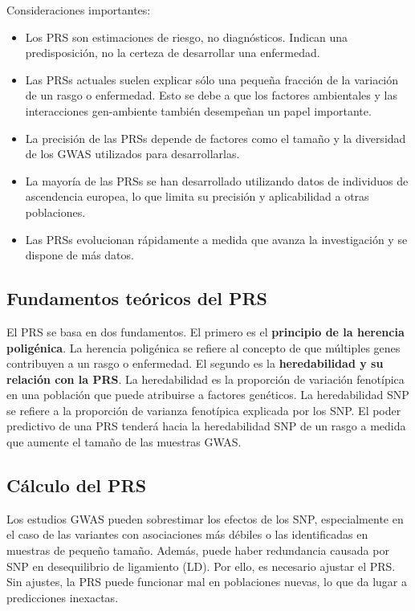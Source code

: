 Consideraciones importantes:
\begin{itemize}
\item Los PRS son estimaciones de riesgo, no diagnósticos. Indican una predisposición, no la certeza de desarrollar una enfermedad.
\item Las PRSs actuales suelen explicar sólo una pequeña fracción de la variación de un rasgo o enfermedad. Esto se debe a que los factores ambientales y las interacciones gen-ambiente también desempeñan un papel importante.
\item La precisión de las PRSs depende de factores como el tamaño y la diversidad de los GWAS utilizados para desarrollarlas.
\item La mayoría de las PRSs se han desarrollado utilizando datos de individuos de ascendencia europea, lo que limita su precisión y aplicabilidad a otras poblaciones.
\item Las PRSs evolucionan rápidamente a medida que avanza la investigación y se dispone de más datos.
\end{itemize}

\subsection{Fundamentos teóricos del PRS}
El PRS se basa en dos fundamentos. El primero es el \textbf{principio de la herencia poligénica}.
La herencia poligénica se refiere al concepto de que múltiples genes contribuyen a un rasgo o enfermedad.
El segundo es la \textbf{heredabilidad y su relación con la PRS}.
La heredabilidad es la proporción de variación fenotípica en una población que puede atribuirse a factores genéticos. La heredabilidad SNP se refiere a la proporción de varianza fenotípica explicada por los SNP. El poder predictivo de una PRS tenderá hacia la heredabilidad SNP de un rasgo a medida que aumente el tamaño de las muestras GWAS.

\subsection{Cálculo del PRS}
Los estudios GWAS pueden sobrestimar los efectos de los SNP, especialmente en el caso de las variantes con asociaciones más débiles o las identificadas en muestras de pequeño tamaño. Además, puede haber redundancia causada por SNP en desequilibrio de ligamiento (LD). Por ello, es necesario ajustar el PRS. Sin ajustes, la PRS puede funcionar mal en poblaciones nuevas, lo que da lugar a predicciones inexactas.

